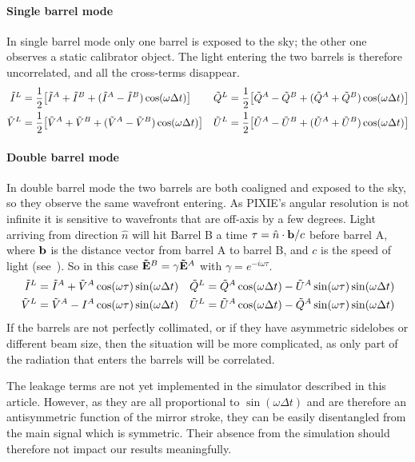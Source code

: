 \documentclass{article}
\newcommand{\I}{\tilde I}
\newcommand{\Q}{\tilde Q}
\newcommand{\U}{\tilde U}
\newcommand{\V}{\tilde V}
\newcommand{\J}{{\tilde E}}
\renewcommand{\vec}[1]{{\bf #1}}
\begin{document}
\paragraph{Single barrel mode}
In single barrel mode only one barrel is exposed to the sky; the other one
observes a static calibrator object. The light entering the two barrels is
therefore uncorrelated, and all the cross-terms disappear.
\begin{align}
	\I^L &= \frac12\big[\I^A+\I^B+(\I^A-\I^B)\cos(\omega\Delta t)\big] &
	\Q^L &= \frac12\big[\Q^A-\Q^B+(\Q^A+\Q^B)\cos(\omega\Delta t)\big] \notag \\
	\V^L &= \frac12\big[\V^A+\V^B+(\V^A-\V^B)\cos(\omega\Delta t)\big] &
	\U^L &= \frac12\big[\U^A-\U^B+(\U^A+\U^B)\cos(\omega\Delta t)\big] \label{eq:single}
\end{align}

\paragraph{Double barrel mode}
In double barrel mode the two barrels are both coaligned and exposed to the sky,
so they observe the same wavefront entering. As PIXIE's angular resolution is
not infinite it is sensitive to wavefronts that are off-axis by a few degrees.
Light arriving from direction $\hat n$ will hit Barrel B a time
$\tau = \hat n \cdot \vec b / c$ before barrel A, where $\vec b$ is the distance vector from
barrel A to barrel B, and $c$ is the speed of light (see~\citet[appendix]{pixie-systematics}).
So in this case $\vec \J^B = \gamma \vec\J^A$ with $\gamma = e^{-i\omega\tau}$.
\begin{align}
	\I^L &= \I^A+\V^A\cos(\omega\tau)\sin(\omega\Delta t) &
	\Q^L &= \Q^A\cos(\omega\Delta t)-\U^A\sin(\omega\tau)\sin(\omega\Delta t) \notag \\
	\V^L &= \V^A-I^A\cos(\omega\tau)\sin(\omega\Delta t) &
	\U^L &= \U^A\cos(\omega\Delta t)-\Q^A\sin(\omega\tau)\sin(\omega\Delta t) \label{eq:double}
\end{align}
If the barrels are not perfectly collimated, or if they have asymmetric sidelobes or different beam size,
then the situation will be more complicated, as only part of the radiation that
enters the barrels will be correlated.

The leakage terms are not yet implemented in the simulator described in this
article. However, as they are all proportional to $\sin(\omega\Delta t)$ and
are therefore an antisymmetric function of the mirror stroke, they can be
easily disentangled from the main signal which is symmetric. Their absence
from the simulation should therefore not impact our results meaningfully.
\end{document}

